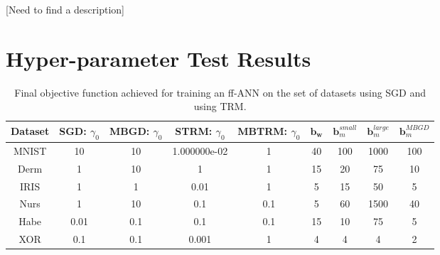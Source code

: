 \documentclass[letterpaper,12pt,titlepage,oneside,final]{book}
\let\origdoublepage\cleardoublepage
\newcommand{\clearemptydoublepage}{%
	\clearpage{\pagestyle{empty}\origdoublepage}}
\let\cleardoublepage\clearemptydoublepage
\begin{document}
	[Need to find a description]
	
	
	
	\chapter[PDF Plots From Matlab]{Hyper-parameter Test Results}
	\label{AppendixA}
	
	
	\begin{table}[h]
		\centering
		\begin{tabular}{ |c|c|c|c|c|c|c|c|c| }  
			\hline
			\textbf{Dataset} & \textbf{SGD: $\gamma_{0}$} & \textbf{MBGD: $\gamma_{0}$} & \textbf{STRM: $\gamma_{0}$} & \textbf{MBTRM: $\gamma_{0}$} & $\mathbf{b_{w}}$ & $\mathbf{b}_{m}^{small}$ & $\mathbf{b}_{m}^{large}$ & $\mathbf{b}_{m}^{MBGD}$ \\
			\hline
			MNIST & 10 & 10 & 1.000000e-02 & 1 & 40 & 100 & 1000 & 100 \\
			\hline
			Derm & 1 & 10 & 1 & 1 & 15 & 20 & 75 & 10\\
			\hline
			IRIS & 1 & 1 & 0.01 & 1 & 5 & 15 & 50 & 5\\
			\hline
			Nurs & 1 & 10 & 0.1 & 0.1 & 5 & 60 & 1500 & 40\\
			\hline
			Habe & 0.01 & 0.1 & 0.1 & 0.1 & 15 & 10 & 75 & 5 \\ 
			\hline
			XOR & 0.1 & 0.1 & 0.001 & 1 & 4 & 4 & 4 & 2\\
			\hline
		\end{tabular}
		\caption{Final objective function achieved for training an ff-ANN on the set of datasets using SGD and using TRM.}
		\label{table:hyperparam}
	\end{table}
	
	
	
	
	\cleardoublepage %
	\renewcommand*{\bibname}{References}
	
\end{document}
